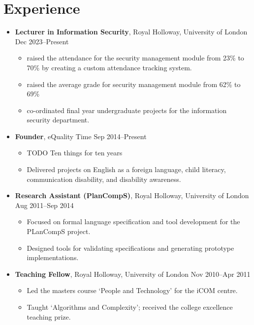 \section*{Experience}

\begin{itemize}
  \item \textbf{Lecturer in Information Security}, Royal Holloway, University of London \hfill Dec 2023--Present
  \begin{itemize}
    \item raised the attendance for the security management module from 23\% to 70\% by creating a custom attendance tracking system. 
    \item raised the average grade for security management module from 62\% to 69\% 
    \item co-ordinated final year undergraduate projects for the information security department. 
  \end{itemize}

  \item \textbf{Founder}, eQuality Time \hfill Sep 2014--Present
  \begin{itemize}
    \item TODO  Ten things for ten years 
    \item Delivered projects on English as a foreign language, child literacy, communication disability, and disability awareness.
  \end{itemize}

  \item \textbf{Research Assistant (PlanCompS)}, Royal Holloway, University of London \hfill Aug 2011--Sep 2014
  \begin{itemize}
    \item Focused on formal language specification and tool development for the PLanCompS project.
    \item Designed tools for validating specifications and generating prototype implementations.
  \end{itemize}

  \item \textbf{Teaching Fellow}, Royal Holloway, University of London \hfill Nov 2010--Apr 2011
  \begin{itemize}
    \item Led the masters course ‘People and Technology’ for the iCOM centre.
    \item Taught ‘Algorithms and Complexity’; received the college excellence teaching prize.
  \end{itemize}


\end{itemize}
